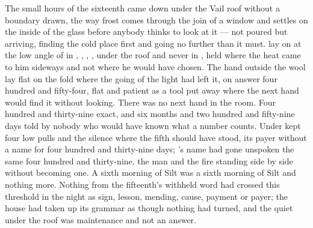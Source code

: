 
The small hours of the sixteenth came down under the Vail roof without a boundary drawn, the way frost comes through the join of a window and settles on the inside of the glass before anybody thinks to look at it --- not poured but arriving, finding the cold place first and going no further than it must.  lay on  at the low angle of  in , , , , under the roof and never in , held where the heat came to him sideways and not where he would have chosen. The hand outside the wool lay flat on the fold where the going of the light had left it, on answer four hundred and fifty-four, flat and patient as a tool put away where the next hand would find it without looking. There was no next hand in the room. Four hundred and thirty-nine exact, and six months and two hundred and fifty-nine days told by nobody who would have known what a number counts. Under   kept four low pulls and the silence where the fifth should have stood, its payer without a name for four hundred and thirty-nine days; 's name had gone unspoken the same four hundred and thirty-nine, the man and the fire standing side by side without becoming one. A sixth morning of Silt was a sixth morning of Silt and nothing more. Nothing from the fifteenth's withheld word had crossed this threshold in the night as sign, lesson, mending, cause, payment or payer; the house had taken up its grammar as though nothing had turned, and the quiet under the roof was maintenance and not an answer.

